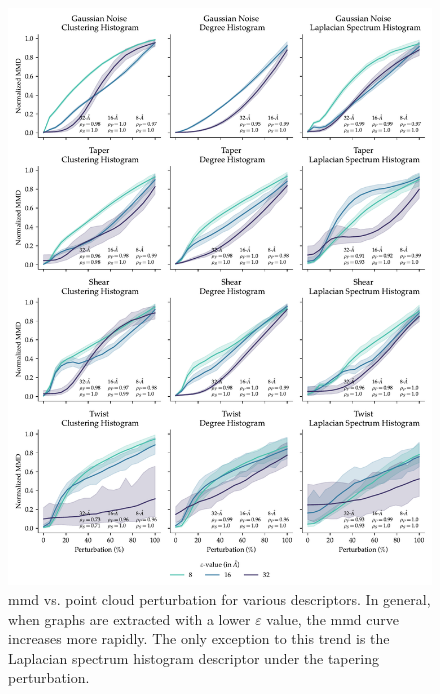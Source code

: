 \begin{figure}
  \includegraphics[width=\textwidth]{./figures/results/res_2_1.pdf}
  \caption[Influence of $\varepsilon$ on the sensitivity of \acrshort{mmd} to perturbations.]{\acrshort{mmd} vs. point cloud perturbation for various descriptors. In general,
when graphs are extracted with a lower $\varepsilon$ value, the \acrshort{mmd} curve
increases more rapidly. The only exception to this trend is the Laplacian
spectrum histogram descriptor under the tapering perturbation.}
  \label{fig:mmd_sensitivity_eps}
\end{figure}

